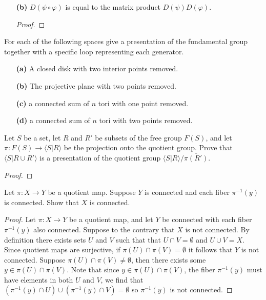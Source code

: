 \documentclass{homework651}
\begin{document}
\begin{problems}
\begin{enumerate}
    \begin{proof} $(\Leftarrow)$ Suppose $D(\varphi) = D(\psi)$, where $D$ is defined 
        
    \end{proof}


    \item[\textbf{(b)}] $D(\psi \circ \varphi)$ is equal to the matrix product $D(\psi)D(\varphi)$. 
    \begin{proof}
        
    \end{proof}
\end{enumerate}




\problem For each of the following spaces give a presentation of the fundamental group together with a specific loop 
representing each generator. 
\begin{enumerate}
    \item[\textbf{(a)}] A closed disk with two interior points removed. 
    \item[\textbf{(b)}] The projective plane with two points removed. 
    \item[\textbf{(c)}] a connected sum of $n$ tori with one point removed. 
    \item[\textbf{(d)}] a connected sum of $n$ tori with two points removed. 
\end{enumerate}


\problem Let $S$ be a set, let $R$ and $R'$ be subsets of the free group $F(S)$, and let 
$\pi: F(S) \to \langle S|R \rangle$ be the projection onto the quotient group. Prove that 
$\langle S | R \cup R'\rangle$ is a presentation of the quotient group $\langle S | R \rangle / \overline{\pi(R')}$. 
\begin{proof}
    
\end{proof}






\problem Let $\pi: X \to Y$ be a quotient map. Suppose $Y$ is connected and each fiber $\pi^{-1}(y)$ is connected. 
Show that $X$ is connected. 
\begin{proof} Let $\pi: X \to Y$ be a quotient map, and let $Y$ be connected with each fiber $\pi^{-1}(y)$ also connected. Suppose
    to the contrary that $X$ is not connected. By definition there exists sets $U$ and $V$ such that that $U \cap V = \emptyset$
    and $U \cup V = X$. Since quotient maps are surjective, if $\pi(U) \cap \pi(V) = \emptyset$ it follows that $Y$ is not connected.
    Suppose $\pi(U) \cap \pi(V) \neq \emptyset$, then there exists some $y \in \pi(U) \cap \pi(V)$. Note that since 
    $y \in \pi(U) \cap \pi(V)$, the fiber $\pi^{-1}(y)$ must have elements in both $U$ and $V$, we find that 
    $(\pi^{-1}(y) \cap U) \cup (\pi^{-1}(y) \cap V) = \emptyset$ so $\pi^{-1}(y)$ is not connected. 
    

\end{proof}
\end{problems}
\end{document}
